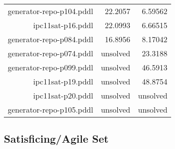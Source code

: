 \documentclass{article}
\begin{document}
\begin{center}
\begin{tabular}{r|r|r}
 generator-repo-p104.pddl&22.2057&6.59562\\
 ipc11sat-p16.pddl&22.0993&6.66515\\
 generator-repo-p084.pddl&16.8956&8.17042\\
 generator-repo-p074.pddl&unsolved&23.3188\\
 generator-repo-p099.pddl&unsolved&46.5913\\
 ipc11sat-p19.pddl&unsolved&48.8754\\
 ipc11sat-p20.pddl&unsolved&unsolved\\
 generator-repo-p105.pddl&unsolved&unsolved
                            \end{tabular}
                            \end{center}
                    
                    
                    \subsection*{Satisficing/Agile Set}
                    
\end{document}
